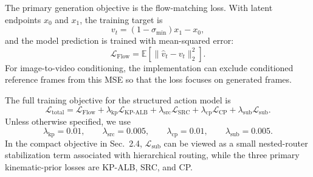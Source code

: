 The primary generation objective is the flow-matching loss. With latent endpoints $x_0$ and $x_1$, the training target is
\[
    v_t=(1-\sigma_{\min})x_1-x_0,
\]
and the model prediction is trained with mean-squared error:
\[
    \mathcal{L}_{\mathrm{Flow}}
    =
    \mathbb{E}\left[\|\hat{v}_t-v_t\|_2^2\right].
\]
For image-to-video conditioning, the implementation can exclude conditioned reference frames from this MSE so that the loss focuses on generated frames.

The full training objective for the structured action model is
\[
    \mathcal{L}_{\mathrm{total}}
    =
    \mathcal{L}_{\mathrm{Flow}}
    +\lambda_{\mathrm{kp}}\mathcal{L}_{\mathrm{KP\mbox{-}ALB}}
    +\lambda_{\mathrm{src}}\mathcal{L}_{\mathrm{SRC}}
    +\lambda_{\mathrm{cp}}\mathcal{L}_{\mathrm{CP}}
    +\lambda_{\mathrm{sub}}\mathcal{L}_{\mathrm{sub}} .
\]
Unless otherwise specified, we use
\[
    \lambda_{\mathrm{kp}}=0.01,\qquad
    \lambda_{\mathrm{src}}=0.005,\qquad
    \lambda_{\mathrm{cp}}=0.01,\qquad
    \lambda_{\mathrm{sub}}=0.005 .
\]
In the compact objective in Sec.~2.4, $\mathcal{L}_{\mathrm{sub}}$ can be viewed as a small nested-router stabilization term associated with hierarchical routing, while the three primary kinematic-prior losses are KP-ALB, SRC, and CP.
